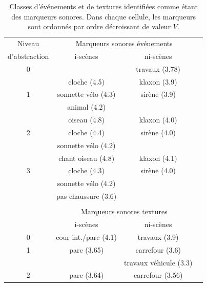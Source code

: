 
\begin{table}[t]
 \setlength{\tabcolsep}{0.2pt}
 \centering
  {\renewcommand{\arraystretch}{0.9}
\begin{tabular}{c c c c} 
Niveau        & \multicolumn{2}{c}{Marqueurs sonores événements} \\
d'abstraction & i-scènes & ni-scènes \\
\hline
0  &                          & travaux (3.78)  \\
\hline
  & cloche  (4.5)             & klaxon  (3.9) \\
1 & sonnette vélo  (4.3)      & sirène (3.9)\\
  & animal (4.2)              &       \\
   \hline
  & oiseau        (4.8)       & klaxon  (4.0)\\
2 & cloche  (4.4)             & sirène (4.0)\\
  & sonnette vélo    (4.2)             &       \\
   \hline
  & chant oiseau (4.8)        & klaxon  (4.1)\\
3 & cloche   (4.3)            & sirène (4.0)\\
  & sonnette vélo     (4.2)   &       \\
  & pas chaussure  (3.6)      &  \\
  &                           & \\ 
  & \multicolumn{2}{c}{Marqueurs sonores textures}      \\
  & i-scènes & ni-scènes \\
\hline
0 &     cour int./parc (4.1) &  travaux (3.9)  \\
\hline
1 &     parc (3.65)          &  carrefour (3.6)  \\
  &                          &  travaux véhicule (3.3)  \\
\hline
2 &     parc (3.64)          &  carrefour (3.56)  \\
\hline
\end{tabular}
} 
\vspace{0.5mm}
\caption[Classes d'événements et de textures identifiées comme étant des marqueurs sonores.]{Classes d'événements et de textures identifiées comme étant des marqueurs sonores. Dans chaque cellule, les marqueurs sont ordonnés par ordre décroissant de valeur $V$.}
\label{tab:markers}
\end{table}

